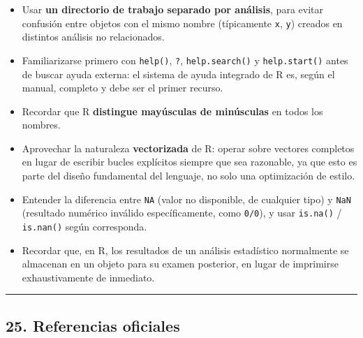 \documentclass[
  jou,
  floatsintext,
  longtable,
  a4paper,
  nolmodern,
  notxfonts,
  notimes,
  12pt,
  colorlinks=true,linkcolor=blue,citecolor=blue,urlcolor=blue]{apa7}
\providecommand{\tightlist}{%
  \setlength{\itemsep}{0pt}\setlength{\parskip}{0pt}}
\begin{document}
\begin{itemize}
\tightlist
\item
  Usar \textbf{un directorio de trabajo separado por análisis}, para
  evitar confusión entre objetos con el mismo nombre (típicamente
  \texttt{x}, \texttt{y}) creados en distintos análisis no relacionados.
\item
  Familiarizarse primero con \texttt{help()}, \texttt{?},
  \texttt{help.search()} y \texttt{help.start()} antes de buscar ayuda
  externa: el sistema de ayuda integrado de R es, según el manual,
  completo y debe ser el primer recurso.
\item
  Recordar que R \textbf{distingue mayúsculas de minúsculas} en todos
  los nombres.
\item
  Aprovechar la naturaleza \textbf{vectorizada} de R: operar sobre
  vectores completos en lugar de escribir bucles explícitos siempre que
  sea razonable, ya que esto es parte del diseño fundamental del
  lenguaje, no solo una optimización de estilo.
\item
  Entender la diferencia entre \texttt{NA} (valor no disponible, de
  cualquier tipo) y \texttt{NaN} (resultado numérico inválido
  específicamente, como \texttt{0/0}), y usar \texttt{is.na()} /
  \texttt{is.nan()} según corresponda.
\item
  Recordar que, en R, los resultados de un análisis estadístico
  normalmente se almacenan en un objeto para su examen posterior, en
  lugar de imprimirse exhaustivamente de inmediato.
\end{itemize}

\begin{center}\rule{0.5\linewidth}{0.5pt}\end{center}

\subsection{25. Referencias oficiales}\label{referencias-oficiales}
\end{document}
